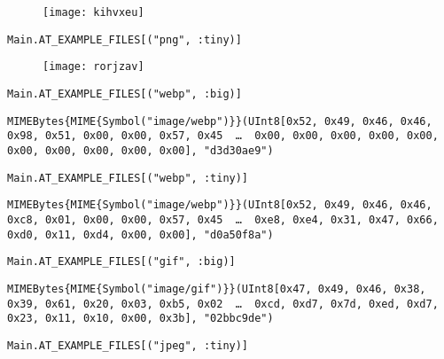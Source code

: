 \begin{figure}[H]
\centering
\texttt{[image: kihvxeu]}
\end{figure}




\begin{lstlisting}[]
Main.AT_EXAMPLE_FILES[("png", :tiny)]
\end{lstlisting}

\begin{figure}[H]
\centering
\texttt{[image: rorjzav]}
\end{figure}




\begin{lstlisting}[]
Main.AT_EXAMPLE_FILES[("webp", :big)]
\end{lstlisting}


\begin{lstlisting}[]
MIMEBytes{MIME{Symbol("image/webp")}}(UInt8[0x52, 0x49, 0x46, 0x46, 0x98, 0x51, 0x00, 0x00, 0x57, 0x45  …  0x00, 0x00, 0x00, 0x00, 0x00, 0x00, 0x00, 0x00, 0x00, 0x00], "d3d30ae9")
\end{lstlisting}




\begin{lstlisting}[]
Main.AT_EXAMPLE_FILES[("webp", :tiny)]
\end{lstlisting}


\begin{lstlisting}[]
MIMEBytes{MIME{Symbol("image/webp")}}(UInt8[0x52, 0x49, 0x46, 0x46, 0xc8, 0x01, 0x00, 0x00, 0x57, 0x45  …  0xe8, 0xe4, 0x31, 0x47, 0x66, 0xd0, 0x11, 0xd4, 0x00, 0x00], "d0a50f8a")
\end{lstlisting}




\begin{lstlisting}[]
Main.AT_EXAMPLE_FILES[("gif", :big)]
\end{lstlisting}


\begin{lstlisting}[]
MIMEBytes{MIME{Symbol("image/gif")}}(UInt8[0x47, 0x49, 0x46, 0x38, 0x39, 0x61, 0x20, 0x03, 0xb5, 0x02  …  0xcd, 0xd7, 0x7d, 0xed, 0xd7, 0x23, 0x11, 0x10, 0x00, 0x3b], "02bbc9de")
\end{lstlisting}




\begin{lstlisting}[]
Main.AT_EXAMPLE_FILES[("jpeg", :tiny)]
\end{lstlisting}

